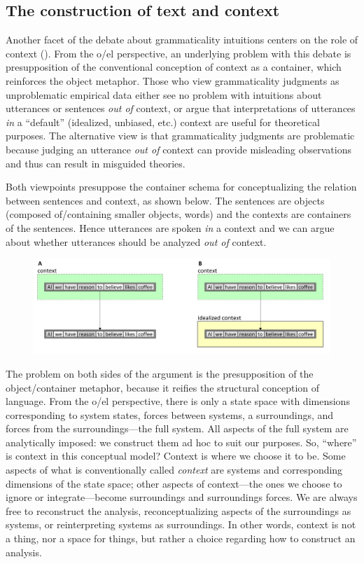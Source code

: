 \subsection{The construction of text and context}

Another facet of the debate about grammaticality intuitions centers on the role of context (\citealt{Bolinger1965,Keller2000,Schütze2016}). From the o/el perspective, an underlying problem with this debate is presupposition of the conventional conception of context as a container, which reinforces the object metaphor. Those who view grammaticality judgments as unproblematic empirical data either  see no problem with intuitions about utterances or sentences \textit{out of} context, or  argue that interpretations of utterances \textit{in} a “default” (idealized, unbiased, etc.) context are useful for theoretical purposes. The alternative view is that grammaticality judgments are problematic because judging an utterance \textit{out of} context can provide misleading observations and thus can result in misguided theories.

  Both viewpoints presuppose the container schema for conceptualizing the relation between sentences and context, as shown below. The sentences are objects (composed of/containing smaller objects, words) and the contexts are containers of the sentences. Hence utterances are spoken \textit{in} a context and we can argue about whether utterances should be analyzed \textit{out of} context.   

  
\begin{figure}
\includegraphics[width=\textwidth]{figures/Tilsen-img120.png}
\caption{\missingcaption}
\label{fig:}
\end{figure}
 

  The problem on both sides of the argument is the presupposition of the object/container metaphor, because it reifies the structural conception of language. From the o/el perspective, there is only a state space with dimensions corresponding to system states, forces between systems, a surroundings, and forces from the surroundings—the full system. All aspects of the full system are analytically imposed: we construct them ad hoc to suit our purposes. So, “where” is context in this conceptual model? Context is where we choose it to be. Some aspects of what is conventionally called \textit{context} are systems and corresponding dimensions of the state space; other aspects of context—the ones we choose to ignore or integrate—become surroundings and surroundings forces. We are always free to reconstruct the analysis, reconceptualizing aspects of the surroundings as systems, or reinterpreting systems as surroundings. In other words, context is not a thing, nor a space for things, but rather a choice regarding how to construct an analysis.

